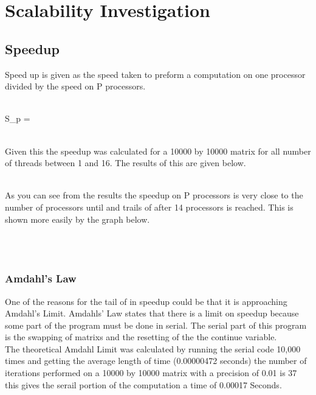 \documentclass{article}
\begin{document}
\section{Scalability Investigation}
\subsection{Speedup}
Speed up is given as the speed taken to preform a computation on one processor
divided by the speed on P processors.\\~\\
\begin{center}
S_p = \\~\\
\end{center}
Given this the speedup was calculated for a 10000 by 10000 matrix for all number
of threads between 1 and 16. The results of this are given below.\\~\\
\begin{center}
\end{center}

As you can see from the results the speedup on P processors is very close to the
number of processors until and trails of after 14 processors is reached. This is
shown more easily by the graph below.\\

\begin{figure}[h!]
 \centering
 \end{figure}\\~\\

 \subsubsection{Amdahl’s Law}
 One of the reasons for the tail of in speedup could be that it is approaching
 Amdahl's Limit. Amdahls' Law states that there is a limit on speedup because
 some part of the program must be done in serial. The serial part of this program
 is the swapping of matrixs and the resetting of the the continue variable.\\
 The theoretical Amdahl Limit was calculated by running the serial code 10,000
 times and getting the average length of time (0.00000472 seconds) the number of
 iterations performed on a 10000 by 10000 matrix with a precision of 0.01 is 37
 this gives the serail portion of the computation a time of 0.00017 Seconds.  
\end{document}
